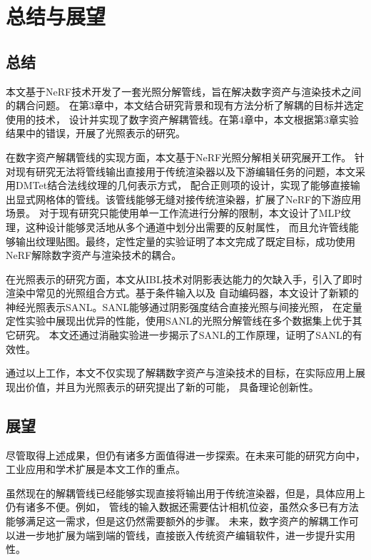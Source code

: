 
\chapter{总结与展望}

\section{总结}

本文基于NeRF技术开发了一套光照分解管线，旨在解决数字资产与渲染技术之间的耦合问题。
在第3章中，本文结合研究背景和现有方法分析了解耦的目标并选定使用的技术，
设计并实现了数字资产解耦管线。在第4章中，本文根据第3章实验结果中的错误，开展了光照表示的研究。

在数字资产解耦管线的实现方面，本文基于NeRF光照分解相关研究展开工作。
针对现有研究无法将管线输出直接用于传统渲染器以及下游编辑任务的问题，本文采用DMTet结合法线纹理的几何表示方式，
配合正则项的设计，实现了能够直接输出显式网格体的管线。该管线能够无缝对接传统渲染器，扩展了NeRF的下游应用场景。
对于现有研究只能使用单一工作流进行分解的限制，本文设计了MLP纹理，这种设计能够灵活地从多个通道中划分出需要的反射属性，
而且允许管线能够输出纹理贴图。最终，定性定量的实验证明了本文完成了既定目标，成功使用NeRF解除数字资产与渲染技术的耦合。

在光照表示的研究方面，本文从IBL技术对阴影表达能力的欠缺入手，引入了即时渲染中常见的光照组合方式。基于条件输入以及
自动编码器，本文设计了新颖的神经光照表示SANL。SANL能够通过阴影强度结合直接光照与间接光照，
在定量定性实验中展现出优异的性能，使用SANL的光照分解管线在多个数据集上优于其它研究。
本文还通过消融实验进一步揭示了SANL的工作原理，证明了SANL的有效性。

通过以上工作，本文不仅实现了解耦数字资产与渲染技术的目标，在实际应用上展现出价值，并且为光照表示的研究提出了新的可能，
具备理论创新性。

\section{展望}

尽管取得上述成果，但仍有诸多方面值得进一步探索。在未来可能的研究方向中，工业应用和学术扩展是本文工作的重点。

虽然现在的解耦管线已经能够实现直接将输出用于传统渲染器，但是，具体应用上仍有诸多不便。例如，
管线的输入数据还需要估计相机位姿，虽然众多已有方法能够满足这一需求，但是这仍然需要额外的步骤。
未来，数字资产的解耦工作可以进一步地扩展为端到端的管线，直接嵌入传统资产编辑软件，进一步提升实用性。

